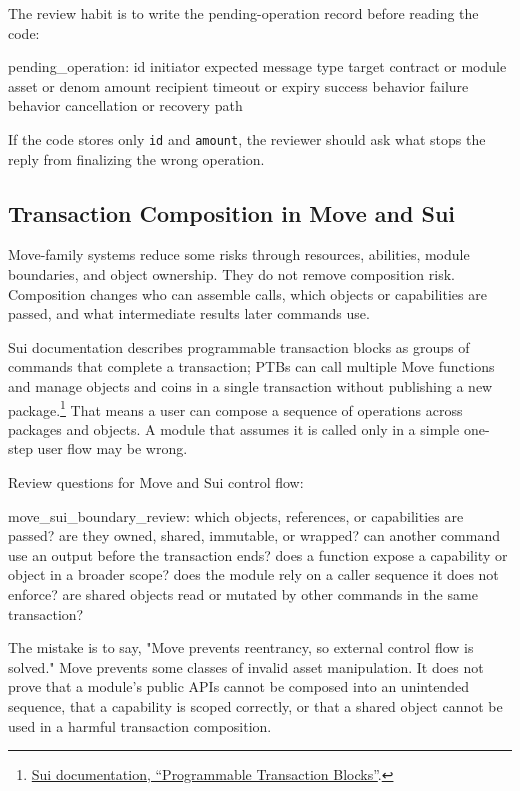 The review habit is to write the pending-operation record before reading the code:

\begin{codeblock}
pending_operation:
    id
    initiator
    expected message type
    target contract or module
    asset or denom
    amount
    recipient
    timeout or expiry
    success behavior
    failure behavior
    cancellation or recovery path
\end{codeblock}

If the code stores only \texttt{id} and \texttt{amount}, the reviewer should ask what stops the reply from finalizing the wrong operation.

\subsection{Transaction Composition in Move and Sui}

Move-family systems reduce some risks through resources, abilities, module boundaries, and object ownership. They do not remove composition risk. Composition changes who can assemble calls, which objects or capabilities are passed, and what intermediate results later commands use.

Sui documentation describes programmable transaction blocks as groups of commands that complete a transaction; PTBs can call multiple Move functions and manage objects and coins in a single transaction without publishing a new package.\footnote{\href{https://docs.sui.io/develop/transactions/ptbs/prog-txn-blocks}{Sui documentation, ``Programmable Transaction Blocks''}.} That means a user can compose a sequence of operations across packages and objects. A module that assumes it is called only in a simple one-step user flow may be wrong.

Review questions for Move and Sui control flow:

\begin{codeblock}
move_sui_boundary_review:
    which objects, references, or capabilities are passed?
    are they owned, shared, immutable, or wrapped?
    can another command use an output before the transaction ends?
    does a function expose a capability or object in a broader scope?
    does the module rely on a caller sequence it does not enforce?
    are shared objects read or mutated by other commands in the same transaction?
\end{codeblock}

The mistake is to say, "Move prevents reentrancy, so external control flow is solved." Move prevents some classes of invalid asset manipulation. It does not prove that a module's public APIs cannot be composed into an unintended sequence, that a capability is scoped correctly, or that a shared object cannot be used in a harmful transaction composition.

